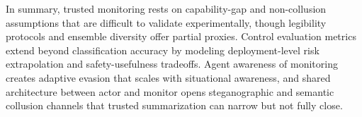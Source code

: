 In summary, trusted monitoring rests on capability-gap and non-collusion assumptions that are difficult to validate experimentally, though legibility protocols and ensemble diversity offer partial proxies. Control evaluation metrics extend beyond classification accuracy by modeling deployment-level risk extrapolation and safety-usefulness tradeoffs. Agent awareness of monitoring creates adaptive evasion that scales with situational awareness, and shared architecture between actor and monitor opens steganographic and semantic collusion channels that trusted summarization can narrow but not fully close.





